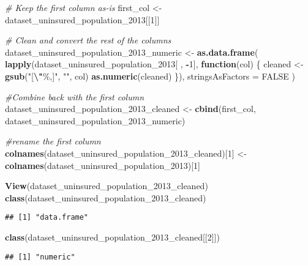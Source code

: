 \documentclass[
]{article}
\newenvironment{Shaded}{\begin{snugshade}}{\end{snugshade}}
\newcommand{\AttributeTok}[1]{\textcolor[rgb]{0.13,0.29,0.53}{#1}}
\newcommand{\CommentTok}[1]{\textcolor[rgb]{0.56,0.35,0.01}{\textit{#1}}}
\newcommand{\ConstantTok}[1]{\textcolor[rgb]{0.56,0.35,0.01}{#1}}
\newcommand{\ControlFlowTok}[1]{\textcolor[rgb]{0.13,0.29,0.53}{\textbf{#1}}}
\newcommand{\DecValTok}[1]{\textcolor[rgb]{0.00,0.00,0.81}{#1}}
\newcommand{\FunctionTok}[1]{\textcolor[rgb]{0.13,0.29,0.53}{\textbf{#1}}}
\newcommand{\NormalTok}[1]{#1}
\newcommand{\OtherTok}[1]{\textcolor[rgb]{0.56,0.35,0.01}{#1}}
\newcommand{\SpecialCharTok}[1]{\textcolor[rgb]{0.81,0.36,0.00}{\textbf{#1}}}
\newcommand{\StringTok}[1]{\textcolor[rgb]{0.31,0.60,0.02}{#1}}
\begin{document}
\begin{Shaded}
\begin{Highlighting}[]
\CommentTok{\# Keep the first column as{-}is}
\NormalTok{first\_col }\OtherTok{\textless{}{-}}\NormalTok{ dataset\_uninsured\_population\_2013[[}\DecValTok{1}\NormalTok{]]}

\CommentTok{\# Clean and convert the rest of the columns}
\NormalTok{dataset\_uninsured\_population\_2013\_numeric }\OtherTok{\textless{}{-}} \FunctionTok{as.data.frame}\NormalTok{(}
  \FunctionTok{lapply}\NormalTok{(dataset\_uninsured\_population\_2013[ , }\SpecialCharTok{{-}}\DecValTok{1}\NormalTok{], }\ControlFlowTok{function}\NormalTok{(col) \{}
\NormalTok{    cleaned }\OtherTok{\textless{}{-}} \FunctionTok{gsub}\NormalTok{(}\StringTok{"[}\SpecialCharTok{\textbackslash{}"}\StringTok{\%,]"}\NormalTok{, }\StringTok{""}\NormalTok{, col)}
    \FunctionTok{as.numeric}\NormalTok{(cleaned)}
\NormalTok{  \}),}
  \AttributeTok{stringsAsFactors =} \ConstantTok{FALSE}
\NormalTok{)}

\CommentTok{\#Combine back with the first column}
\NormalTok{dataset\_uninsured\_population\_2013\_cleaned }\OtherTok{\textless{}{-}} \FunctionTok{cbind}\NormalTok{(first\_col, dataset\_uninsured\_population\_2013\_numeric)}

\CommentTok{\#rename the first column}
\FunctionTok{colnames}\NormalTok{(dataset\_uninsured\_population\_2013\_cleaned)[}\DecValTok{1}\NormalTok{] }\OtherTok{\textless{}{-}} \FunctionTok{colnames}\NormalTok{(dataset\_uninsured\_population\_2013)[}\DecValTok{1}\NormalTok{]}

\FunctionTok{View}\NormalTok{(dataset\_uninsured\_population\_2013\_cleaned)}
\FunctionTok{class}\NormalTok{(dataset\_uninsured\_population\_2013\_cleaned)}
\end{Highlighting}
\end{Shaded}

\begin{verbatim}
## [1] "data.frame"
\end{verbatim}

\begin{Shaded}
\begin{Highlighting}[]
\FunctionTok{class}\NormalTok{(dataset\_uninsured\_population\_2013\_cleaned[[}\DecValTok{2}\NormalTok{]])}
\end{Highlighting}
\end{Shaded}

\begin{verbatim}
## [1] "numeric"
\end{verbatim}
\end{document}
